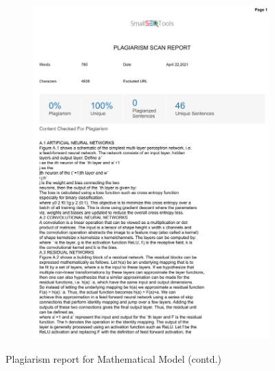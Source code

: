 \documentclass[oneside,a4paper,12pt]{report}
\begin{document}
\begin{appendices}
\begin{figure}
\begin{subfigure}[H]{\textwidth}
    	\includegraphics[scale=0.7, page=2]{plagiarism/mathematical_model.pdf}
    \end{subfigure}
    \caption{Plagiarism report for Mathematical Model (contd.)}
    \label{PlagiarismMath_1}
\end{figure}


\end{appendices}
\end{document}

